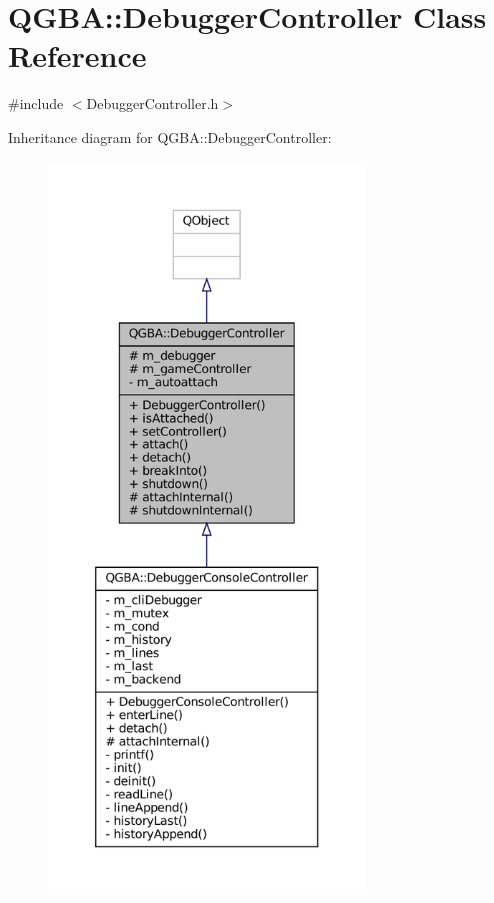 \hypertarget{class_q_g_b_a_1_1_debugger_controller}{}\section{Q\+G\+BA\+:\+:Debugger\+Controller Class Reference}
\label{class_q_g_b_a_1_1_debugger_controller}


{\ttfamily \#include $<$Debugger\+Controller.\+h$>$}



Inheritance diagram for Q\+G\+BA\+:\+:Debugger\+Controller\+:
\nopagebreak
\begin{figure}[H]
\begin{center}
\leavevmode
\includegraphics[height=550pt]{class_q_g_b_a_1_1_debugger_controller__inherit__graph}
\end{center}
\end{figure}



